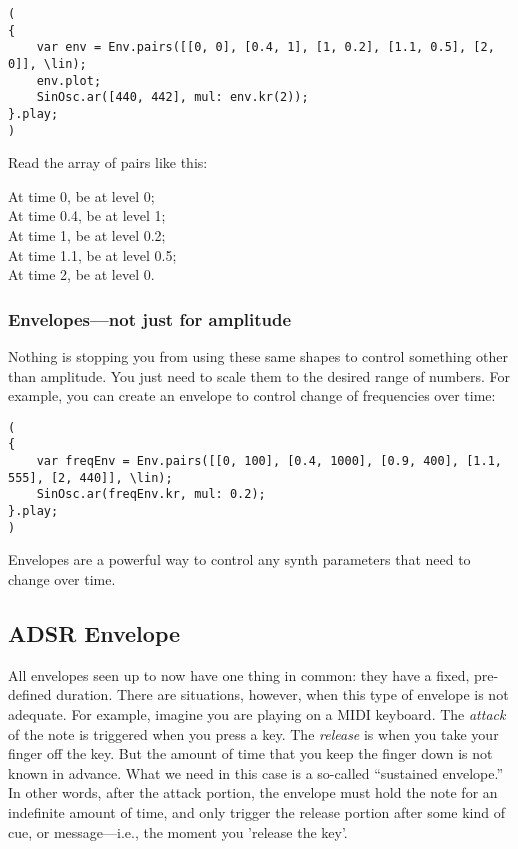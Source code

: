  
\begin{lstlisting}[style=SuperCollider-IDE, basicstyle=\scttfamily\footnotesize]
(
{
	var env = Env.pairs([[0, 0], [0.4, 1], [1, 0.2], [1.1, 0.5], [2, 0]], \lin);
	env.plot;
	SinOsc.ar([440, 442], mul: env.kr(2));
}.play;
)
\end{lstlisting}
 

Read the array of pairs like this:
\begin{center}
At time 0, be at level 0;\\
At time 0.4, be at level 1;\\
At time 1, be at level 0.2;\\
At time 1.1, be at level 0.5;\\
At time 2, be at level 0.
\end{center}

\subsubsection{Envelopes---not just for amplitude}

Nothing is stopping you from using these same shapes to control something other than amplitude. You just need to scale them to the desired range of numbers. For example, you can create an envelope to control change of frequencies over time:

\begin{lstlisting}[style=SuperCollider-IDE, basicstyle=\scttfamily\footnotesize]
(
{
	var freqEnv = Env.pairs([[0, 100], [0.4, 1000], [0.9, 400], [1.1, 555], [2, 440]], \lin);
	SinOsc.ar(freqEnv.kr, mul: 0.2);
}.play;
)
\end{lstlisting}

Envelopes are a powerful way to control any synth parameters that need to change over time.

\subsection{ADSR Envelope}

All envelopes seen up to now have one thing in common: they have a fixed, pre-defined duration. There are situations, however, when this type of envelope is not adequate. For example, imagine you are playing on a MIDI keyboard. The \textit{attack} of the note is triggered when you press a key. The \textit{release} is when you take your finger off the key. But the amount of time that you keep the finger down is not known in advance. What we need in this case is a so-called ``sustained envelope.'' In other words, after the attack portion, the envelope must hold the note for an indefinite amount of time, and only trigger the release portion after some kind of cue, or message---i.e., the moment you 'release the key'.


